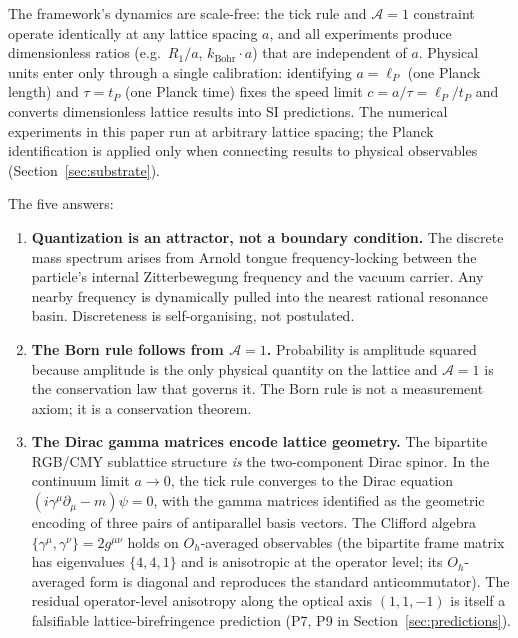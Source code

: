 The framework's dynamics are scale-free: the tick rule and
$\mathcal{A}=1$ constraint operate identically at any lattice spacing
$a$, and all experiments produce dimensionless ratios
(e.g.\ $R_1/a$, $k_\text{Bohr}\cdot a$) that are independent of $a$.
Physical units enter only through a single calibration: identifying
$a = \ell_P$ (one Planck length) and $\tau = t_P$ (one Planck time)
fixes the speed limit $c = a/\tau = \ell_P/t_P$ and converts
dimensionless lattice results into SI predictions.
The numerical experiments in this paper run at arbitrary lattice
spacing; the Planck identification is applied only when connecting
results to physical observables (Section~\ref{sec:substrate}).

The five answers:
\begin{enumerate}
\item \textbf{Quantization is an attractor, not a boundary condition.}
    The discrete mass spectrum arises from Arnold tongue frequency-locking
    between the particle's internal Zitterbewegung frequency and the vacuum
    carrier.
    Any nearby frequency is dynamically pulled into the nearest rational
    resonance basin.
    Discreteness is self-organising, not postulated.

\item \textbf{The Born rule follows from $\mathcal{A}=1$.}
    Probability is amplitude squared because amplitude is the only
    physical quantity on the lattice and $\mathcal{A}=1$ is the
    conservation law that governs it.
    The Born rule is not a measurement axiom; it is a conservation theorem.

\item \textbf{The Dirac gamma matrices encode lattice geometry.}
    The bipartite RGB/CMY sublattice structure \emph{is} the two-component
    Dirac spinor.
    In the continuum limit $a\to 0$, the tick rule converges to the
    Dirac equation $(i\gamma^\mu\partial_\mu - m)\psi = 0$, with the
    gamma matrices identified as the geometric encoding of three pairs
    of antiparallel basis vectors.
    The Clifford algebra $\{\gamma^\mu,\gamma^\nu\} = 2g^{\mu\nu}$ holds
    on $O_h$-averaged observables (the bipartite frame matrix has
    eigenvalues $\{4, 4, 1\}$ and is anisotropic at the operator level;
    its $O_h$-averaged form is diagonal and reproduces the standard
    anticommutator).  The residual operator-level anisotropy along the
    optical axis $(1,1,-1)$ is itself a falsifiable lattice-birefringence
    prediction (P7, P9 in Section~\ref{sec:predictions}).


\end{enumerate}
